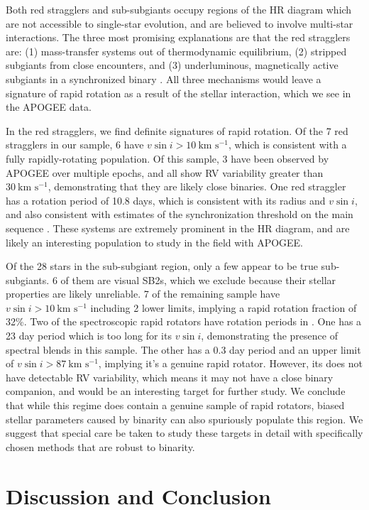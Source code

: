 \documentclass[preprint2]{aastex62}
\newcommand{\vsini}{\ensuremath{v \sin i}}
\newcommand{\kms}{\textrm{km~s}\ensuremath{^{-1}}}
\begin{document}
Both red stragglers and sub-subgiants occupy regions of the HR diagram which 
are not accessible to single-star evolution, and are believed to involve 
multi-star interactions. The three most promising explanations are that
the red stragglers are: (1) mass-transfer systems out of thermodynamic 
equilibrium, (2) stripped subgiants from close encounters, and (3) 
underluminous, magnetically active subgiants in a synchronized binary 
\citep{Leiner17}. All three mechanisms would leave a signature of rapid 
rotation as a result of the stellar interaction, which we see in the APOGEE
data.


In the red stragglers, we find definite signatures of rapid rotation. Of the 7
red stragglers in our sample, 6 have \(\vsini > 10~\kms\), which is consistent
with a fully rapidly-rotating population. Of this
sample, 3 have been observed by APOGEE over multiple epochs, and all show RV 
variability greater than \(30~\kms\), demonstrating that they are likely close 
binaries. One red straggler has a rotation period of 10.8 days, which is 
consistent with its radius and \vsini{}, and also consistent with estimates of the
synchronization threshold on the main sequence \citep{Mazeh08}. These systems
are extremely prominent in the HR diagram, and are likely an interesting
population to study in the field with APOGEE.

Of the 28 stars in the sub-subgiant region, only a few appear to be true 
sub-subgiants. 6 of them are visual SB2s, which we exclude because their stellar
properties are likely unreliable. 7 of the remaining 
sample have \(\vsini > 10~\kms\) including 2 lower limits, implying a
rapid rotation fraction of 32\%. Two of the spectroscopic rapid rotators have 
rotation periods in \citet{McQuillan14}. One has a 23 day period which is too 
long for its \vsini{}, demonstrating the presence of spectral blends in this 
sample. The other has
a 0.3 day period and an upper limit of \(\vsini > 87~\kms\), implying it's a
genuine rapid rotator. However, its does not have detectable RV variability,
which means it may not have a close binary companion, and would be an
interesting target for further study.  We conclude that while this regime does 
contain a genuine sample of rapid rotators, biased stellar parameters
caused by binarity can also spuriously populate this
region. We suggest that special care be taken to study these targets in detail
with specifically chosen methods that are robust to binarity.

\section{Discussion and Conclusion}
\label{sec:discussion}
\end{document}
